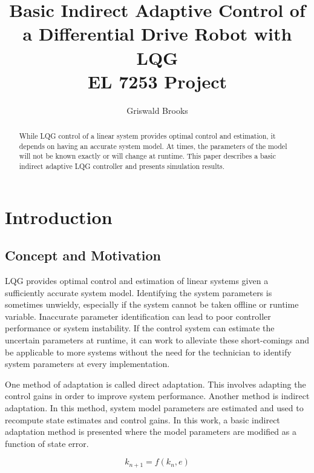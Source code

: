 \documentclass[letterpaper,12pt]{report}
\begin{document}
\title{Basic Indirect Adaptive Control of a Differential Drive Robot with LQG\\EL 7253 Project}
\author{Griswald Brooks}
\maketitle
 
\begin{abstract}
While LQG control of a linear system provides optimal control and estimation, it depends on having an accurate system model.
At times, the parameters of the model will not be known exactly or will change at runtime.
This paper describes a basic indirect adaptive LQG controller and presents simulation results.
\end{abstract}

\tableofcontents

\chapter{Introduction}

\section{Concept and Motivation} \label{sec:concept}
LQG provides optimal control and estimation of linear systems given a sufficiently accurate system model. Identifying the system
parameters is sometimes unwieldy, especially if the system cannot be taken offline or runtime variable.
Inaccurate parameter identification can lead to poor controller performance or system instability.
If the control system can estimate the uncertain parameters at runtime, it can work to alleviate these short-comings and
be applicable to more systems without the need for the technician to identify system parameters at every implementation.

One method of adaptation is called direct adaptation. This involves adapting the control gains in order to improve system performance.
Another method is indirect adaptation. In this method, system model parameters are estimated and used to recompute state estimates and control gains.
In this work, a basic indirect adaptation method is presented where the model parameters are modified as a function of state error.

\begin{equation} \label{eq:changeParam1}
k_{n+1} = f(k_n, e)
\end{equation}
\end{document}
